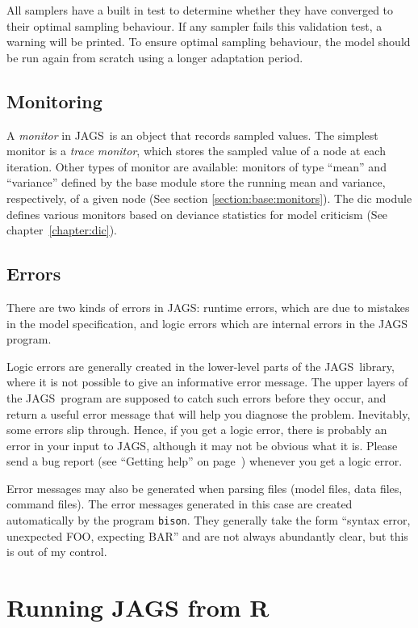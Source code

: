 \documentclass[11pt, a4paper, titlepage]{report}
\newcommand{\JAGS}{\textsf{JAGS}}
\begin{document}
All samplers have a built in test to determine whether they have
converged to their optimal sampling behaviour.  If any sampler fails
this validation test, a warning will be printed. To ensure optimal
sampling behaviour, the model should be run again from scratch using a
longer adaptation period.

\section{Monitoring}
\label{section:monitoring}

A {\em monitor} in \JAGS\ is an object that records sampled
values. The simplest monitor is a {\em trace monitor}, which stores
the sampled value of a node at each iteration. Other types of monitor
are available: monitors of type ``mean'' and ``variance'' defined by
the base module store the running mean and variance, respectively,
of a given node (See section \ref{section:base:monitors}). The dic module
defines various monitors based on deviance statistics for model
criticism (See chapter~\ref{chapter:dic}).

\section{Errors}

There are two kinds of errors in \JAGS: runtime errors, which are due to
mistakes in the model specification, and logic errors which are internal
errors in the JAGS program. 

Logic errors are generally created in the lower-level parts of the
\JAGS\ library, where it is not possible to give an informative error
message.  The upper layers of the \JAGS\ program are supposed to catch
such errors before they occur, and return a useful error message that
will help you diagnose the problem.  Inevitably, some errors slip
through. Hence, if you get a logic error, there is probably an error
in your input to \JAGS, although it may not be obvious what it
is. Please send a bug report (see ``Getting help'' on
page~\pageref{section:help}) whenever you get a logic error.

Error messages may also be generated when parsing files (model files,
data files, command files).  The error messages generated in this case
are created automatically by the program \texttt{bison}. They
generally take the form ``syntax error, unexpected FOO, expecting BAR''
and are not always abundantly clear, but this is out of my control.

\chapter{Running JAGS from R}
\label{chapter:R} 
\end{document}

